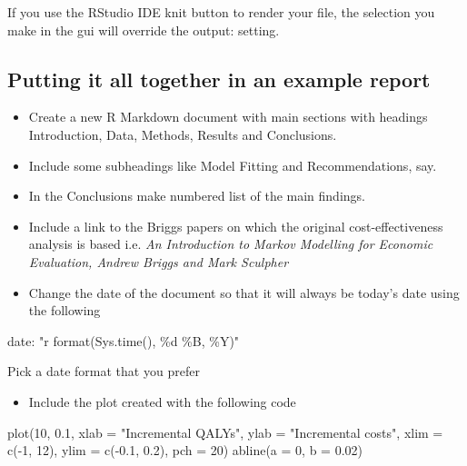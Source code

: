 \documentclass[
]{article}
\newenvironment{Shaded}{\begin{snugshade}}{\end{snugshade}}
\newcommand{\AttributeTok}[1]{\textcolor[rgb]{0.77,0.63,0.00}{#1}}
\newcommand{\DecValTok}[1]{\textcolor[rgb]{0.00,0.00,0.81}{#1}}
\newcommand{\FloatTok}[1]{\textcolor[rgb]{0.00,0.00,0.81}{#1}}
\newcommand{\FunctionTok}[1]{\textcolor[rgb]{0.00,0.00,0.00}{#1}}
\newcommand{\NormalTok}[1]{#1}
\newcommand{\SpecialCharTok}[1]{\textcolor[rgb]{0.00,0.00,0.00}{#1}}
\newcommand{\StringTok}[1]{\textcolor[rgb]{0.31,0.60,0.02}{#1}}
\providecommand{\tightlist}{%
  \setlength{\itemsep}{0pt}\setlength{\parskip}{0pt}}
\begin{document}
If you use the RStudio IDE knit button to render your file, the
selection you make in the gui will override the output: setting.

\hypertarget{putting-it-all-together-in-an-example-report}{%
\subsection{Putting it all together in an example
report}\label{putting-it-all-together-in-an-example-report}}

\begin{itemize}
\item
  Create a new R Markdown document with main sections with headings
  Introduction, Data, Methods, Results and Conclusions.
\item
  Include some subheadings like Model Fitting and Recommendations, say.
\item
  In the Conclusions make numbered list of the main findings.
\item
  Include a link to the Briggs papers on which the original
  cost-effectiveness analysis is based i.e. \emph{An Introduction to
  Markov Modelling for Economic Evaluation, Andrew Briggs and Mark
  Sculpher}
\item
  Change the date of the document so that it will always be today's date
  using the following
\end{itemize}

\begin{Shaded}
\begin{Highlighting}[]
\NormalTok{date}\SpecialCharTok{:} \StringTok{"\textasciigrave{}r format(Sys.time(), \textquotesingle{}\%d \%B, \%Y\textquotesingle{})\textasciigrave{}"}
\end{Highlighting}
\end{Shaded}

Pick a date format that you prefer

\begin{itemize}
\tightlist
\item
  Include the plot created with the following code
\end{itemize}

\begin{Shaded}
\begin{Highlighting}[]
\FunctionTok{plot}\NormalTok{(}\DecValTok{10}\NormalTok{, }\FloatTok{0.1}\NormalTok{,}
     \AttributeTok{xlab =} \StringTok{"Incremental QALYs"}\NormalTok{,}
     \AttributeTok{ylab =} \StringTok{"Incremental costs"}\NormalTok{,}
     \AttributeTok{xlim =} \FunctionTok{c}\NormalTok{(}\SpecialCharTok{{-}}\DecValTok{1}\NormalTok{, }\DecValTok{12}\NormalTok{),}
     \AttributeTok{ylim =} \FunctionTok{c}\NormalTok{(}\SpecialCharTok{{-}}\FloatTok{0.1}\NormalTok{, }\FloatTok{0.2}\NormalTok{),}
     \AttributeTok{pch =} \DecValTok{20}\NormalTok{)}
\FunctionTok{abline}\NormalTok{(}\AttributeTok{a =} \DecValTok{0}\NormalTok{, }\AttributeTok{b =} \FloatTok{0.02}\NormalTok{)}
\end{Highlighting}
\end{Shaded}
\end{document}
